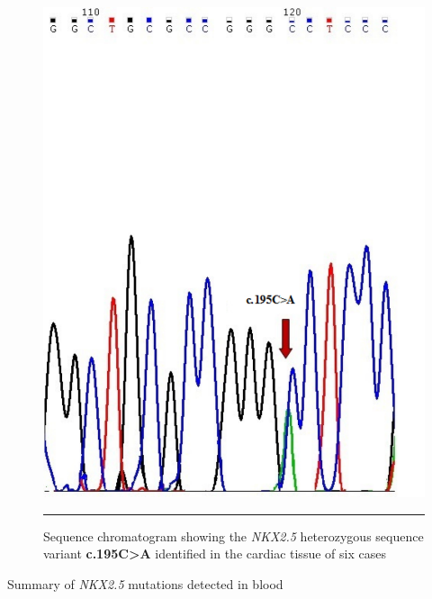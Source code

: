 \begin{refsection}
\begin{figure}[!htb]
\centering
\includegraphics[scale=0.5,keepaspectratio]{Figures/Figure5_3.pdf}
\rule{35em}{0.5pt}
\caption{Sequence chromatogram showing the \textit{NKX2.5} heterozygous sequence variant \textbf{c.195C>A} identified in the cardiac tissue of six cases}
\label{fig:5_3}
\end{figure}



\begin{landscape}
\begin{table}[!p]
\renewcommand{\arraystretch}{1.2}
\centering
\caption{Summary of \textit{NKX2.5} mutations detected in blood}
\label{tab:5_3}


\end{table}
\end{landscape}
\end{refsection}
